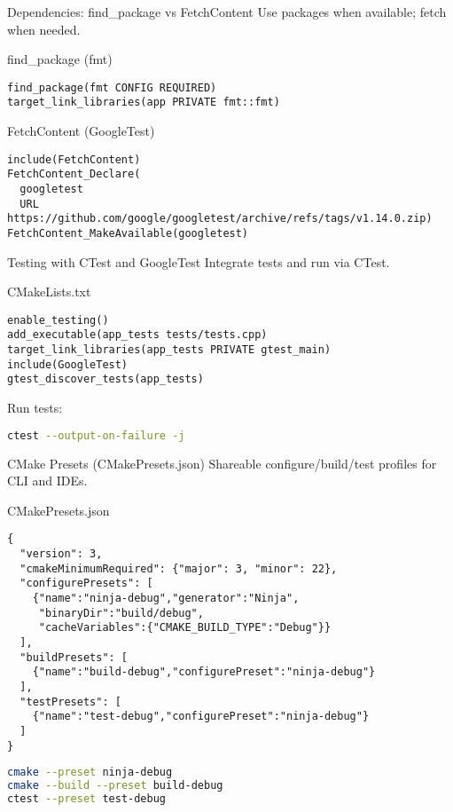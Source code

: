 \documentclass{beamer}
\begin{document}
\begin{frame}[fragile]{Dependencies: find\_package vs FetchContent}
  Use packages when available; fetch when needed.
  \begin{block}{find\_package (fmt)}
    \begin{lstlisting}
find_package(fmt CONFIG REQUIRED)
target_link_libraries(app PRIVATE fmt::fmt)
    \end{lstlisting}
  \end{block}
  \begin{block}{FetchContent (GoogleTest)}
    \begin{lstlisting}
include(FetchContent)
FetchContent_Declare(
  googletest
  URL https://github.com/google/googletest/archive/refs/tags/v1.14.0.zip)
FetchContent_MakeAvailable(googletest)
    \end{lstlisting}
  \end{block}
\end{frame}

\begin{frame}[fragile]{Testing with CTest and GoogleTest}
  Integrate tests and run via CTest.
  \begin{block}{CMakeLists.txt}
    \begin{lstlisting}
enable_testing()
add_executable(app_tests tests/tests.cpp)
target_link_libraries(app_tests PRIVATE gtest_main)
include(GoogleTest)
gtest_discover_tests(app_tests)
    \end{lstlisting}
  \end{block}
  Run tests:
  \begin{lstlisting}[language=bash]
ctest --output-on-failure -j
  \end{lstlisting}
\end{frame}

\begin{frame}[fragile]{CMake Presets (CMakePresets.json)}
  Shareable configure/build/test profiles for CLI and IDEs.
  \begin{block}{CMakePresets.json}
    \begin{lstlisting}
{
  "version": 3,
  "cmakeMinimumRequired": {"major": 3, "minor": 22},
  "configurePresets": [
    {"name":"ninja-debug","generator":"Ninja",
     "binaryDir":"build/debug",
     "cacheVariables":{"CMAKE_BUILD_TYPE":"Debug"}}
  ],
  "buildPresets": [
    {"name":"build-debug","configurePreset":"ninja-debug"}
  ],
  "testPresets": [
    {"name":"test-debug","configurePreset":"ninja-debug"}
  ]
}
    \end{lstlisting}
  \end{block}
  \begin{lstlisting}[language=bash]
cmake --preset ninja-debug
cmake --build --preset build-debug
ctest --preset test-debug
  \end{lstlisting}
\end{frame}
\end{document}
